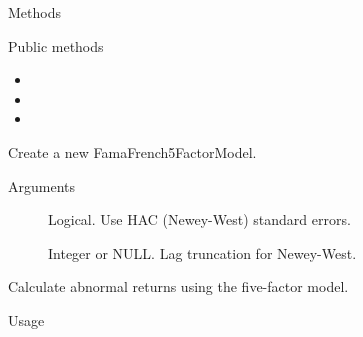\documentclass[a4paper]{book}
\begin{document}
\begin{Section}{Methods}
%
\begin{SubSection}{Public methods}
\begin{itemize}

\item{} 
\item{} 
\item{} 

\end{itemize}

\end{SubSection}




\hypertarget{method-FamaFrench5FactorModel-initialize}{}
%
\begin{SubSection}{}
Create a new FamaFrench5FactorModel.
%

%
\begin{SubSubSection}{Arguments}

\begin{description}

\item[] Logical. Use HAC (Newey-West) standard errors.
\item[] Integer or NULL. Lag truncation for Newey-West.

\end{description}



\end{SubSubSection}

\end{SubSection}




\hypertarget{method-FamaFrench5FactorModel-abnormal_returns}{}
%
\begin{SubSection}{}
Calculate abnormal returns using the five-factor model.
%
\begin{SubSubSection}{Usage}


\end{SubSubSection}
\end{SubSection}
\end{Section}
\end{document}
